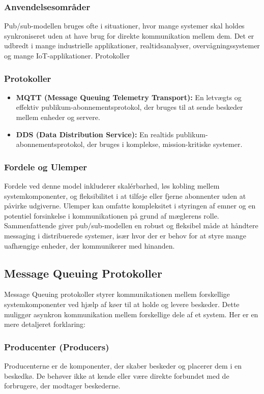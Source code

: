 \begin{enumerate}
	\subsubsection{Anvendelsesområder}
	Pub/sub-modellen bruges ofte i situationer, hvor mange systemer skal holdes synkroniseret uden at have brug for direkte kommunikation mellem dem. Det er udbredt i mange industrielle applikationer, realtidsanalyser, overvågningssystemer og mange IoT-applikationer.
	Protokoller
	\\
	\subsubsection{Protokoller}
	\begin{itemize}
		\item \textbf{MQTT (Message Queuing Telemetry Transport):} En letvægts og effektiv publikum-abonnementsprotokol, der bruges til at sende beskeder mellem enheder og servere.
		\item \textbf{DDS (Data Distribution Service):} En realtids publikum-abonnementsprotokol, der bruges i komplekse, mission-kritiske systemer.
	\end{itemize}
	\subsubsection{Fordele og Ulemper}
	Fordele ved denne model inkluderer skalérbarhed, løs kobling mellem systemkomponenter, og fleksibilitet i at tilføje eller fjerne abonnenter uden at påvirke udgiverne. Ulemper kan omfatte kompleksitet i styringen af emner og en potentiel forsinkelse i kommunikationen på grund af mæglerens rolle.
	\\
	
	Sammenfattende giver pub/sub-modellen en robust og fleksibel måde at håndtere messaging i distribuerede systemer, især hvor der er behov for at styre mange uafhængige enheder, der kommunikerer med hinanden.
\end{enumerate}
\subsection{Message Queuing Protokoller}
Message Queuing protokoller styrer kommunikationen mellem forskellige systemkomponenter ved hjælp af køer til at holde og levere beskeder. Dette muliggør asynkron kommunikation mellem forskellige dele af et system. Her er en mere detaljeret forklaring:
\subsubsection{Producenter (Producers)}		
Producenterne er de komponenter, der skaber beskeder og placerer dem i en beskedkø. De behøver ikke at kende eller være direkte forbundet med de forbrugere, der modtager beskederne.
